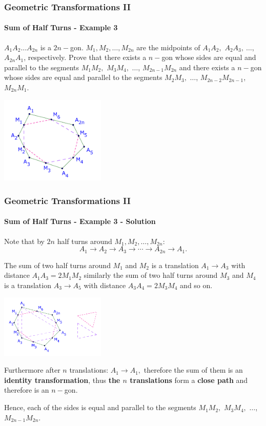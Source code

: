 \documentclass[8pt,xcolor=table,dvipsnames]{beamer}
\begin{document}
\begin{frame}[t]
    \frametitle{Geometric Transformations II}
    \framesubtitle{Sum of Half Turns - Example 3}
    \begin{example}
        $A_1A_2 \ldots A_{2n}$ is a $2n-$gon. $M_1, M_2, \ldots, M_{2n}$ are the midpoints of $A_1A_2,$ $A_2A_3,\ \ldots,$ $A_{2n}A_1$, respectively.
        Prove that there exists a $n-$gon whose sides are equal and parallel to the segments $M_1M_2,$ $M_3M_4,$ $\ldots$, $M_{2n-1}M_{2n}$
        and there exists a $n-$gon whose sides are equal and parallel to the segments $M_2M_3,$ $\ldots$, $M_{2n-2}M_{2n-1}$, $M_{2n}M_1.$ 
    \end{example}

    \begin{center}
        \includegraphics[width=5cm]{./svg/pdf/translation-3a.pdf}
    \end{center}
\end{frame}

\begin{frame}[t]
    \frametitle{Geometric Transformations II}
    \framesubtitle{Sum of Half Turns - Example 3 - Solution}
    Note that by $2n$ half turns around $M_1, M_2, \ldots, M_{2n}$:
    \[
        A_1 \rightarrow A_2 \rightarrow A_3 \rightarrow  \cdots \rightarrow  A_{2n} \rightarrow A_1.
    \]
    
    The sum of two half turns around $M_1$ and $M_2$ is a translation $A_1 \rightarrow A_3$ with distance $A_1A_3 = 2 M_1M_2$
    similarly the sum of two half turns around $M_3$ and $M_4$ is a translation $A_3 \rightarrow A_5$ with distance $A_3A_4 = 2 M_3M_4$
    and so on.

    \begin{center}
        \includegraphics[width=5cm]{./svg/pdf/translation-3b.pdf}
    \end{center}

    Furthermore after $n$ translations: $A_1 \rightarrow A_1,$ therefore the sum of them is an \textbf{identity transformation},
    thus \textbf{the $n$ translations} form a \textbf{close path} and therefore is an $n-$gon.

    \bigbreak
    Hence, each of the sides is equal and parallel to the segments $M_1M_2,$ $M_3M_4,$ $\ldots$, $M_{2n-1}M_{2n}$.
\end{frame}
\end{document}
